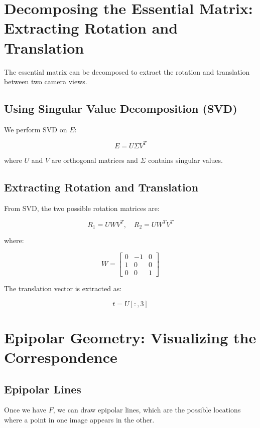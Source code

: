 \documentclass{article}
\begin{document}
\section{Decomposing the Essential Matrix: Extracting Rotation and Translation}
The essential matrix can be decomposed to extract the rotation and translation between two camera views.

\subsection{Using Singular Value Decomposition (SVD)}
We perform SVD on \( E \):

\begin{equation}
    E = U \Sigma V^T
\end{equation}

where \( U \) and \( V \) are orthogonal matrices and \( \Sigma \) contains singular values.

\subsection{Extracting Rotation and Translation}
From SVD, the two possible rotation matrices are:

\begin{equation}
    R_1 = U W V^T, \quad R_2 = U W^T V^T
\end{equation}

where:

\begin{equation}
    W = \begin{bmatrix} 0 & -1 & 0 \\ 1 & 0 & 0 \\ 0 & 0 & 1 \end{bmatrix}
\end{equation}

The translation vector is extracted as:

\begin{equation}
    t = U[:, 3]
\end{equation}

\section{Epipolar Geometry: Visualizing the Correspondence}
\subsection{Epipolar Lines}
Once we have \( F \), we can draw epipolar lines, which are the possible locations where a point in one image appears in the other.
\end{document}

